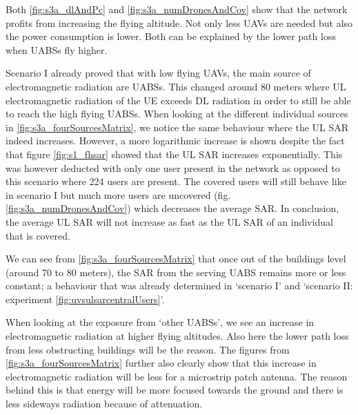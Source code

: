 Both  \ref{fig:s3a_dlAndPc} and \ref{fig:s3a_numDronesAndCov} show that the network profits from increasing the flying altitude. 
Not only less \gls{UAV}s are needed but also the power consumption is lower. Both can be explained by the lower path loss when \gls{UABS}s fly higher.

Scenario I already proved that with low flying \gls{UAV}s, the main source of electromagnetic radiation are \gls{UABS}s. 
This changed around 80 meters where \gls{UL} electromagnetic radiation of the \gls{UE}
exceeds \gls{DL} radiation in order to still be able to reach the high flying \gls{UABS}s. 
When looking at the different individual sources in \ref{fig:s3a_fourSourcesMatrix}, we notice the same behaviour where the 
 \gls{UL} \gls{SAR} indeed increases. However, a more logarithmic increase is shown
  despite the fact that figure \ref{fig:s1_fhsar} showed that the  \gls{UL} \gls{SAR} 
increases exponentially. This was however deducted with only one user present in the network as opposed to this scenario 
where 224 users are present. The covered users will still behave like in scenario I but much more users are uncovered (fig. \ref{fig:s3a_numDronesAndCov}) 
which decreases the average \gls{SAR}. 
In conclusion, the average  \gls{UL} \gls{SAR}  will not increase as fast as the \gls{UL} \gls{SAR} of 
an individual that is covered.

We can see from \ref{fig:s3a_fourSourcesMatrix} that once out of the buildings level (around 70 to 80 meters), the SAR from the serving \gls{UABS} remains 
more or less constant; a behaviour that was already determined in `scenario I' and `scenario II: experiment \ref{fig:uvsulsarcentralUsers}'. 

When looking at the exposure from `other \gls{UABS}s', we see an increase in electromagnetic radiation at higher 
flying altitudes.
Also here the lower path loss from less obstructing buildings will be the reason.
The figures from \ref{fig:s3a_fourSourcesMatrix} further also clearly show that this increase 
in electromagnetic radiation will be less for a microstrip patch antenna. The reason behind this is that energy 
will be more focused towards the ground and there is less sideways radiation because of attenuation.

